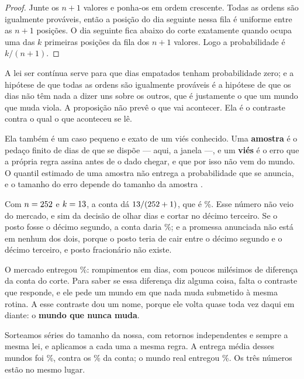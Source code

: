 \begin{proof}
Junte os $n+1$ valores e ponha-os em ordem crescente. Todas as ordens são igualmente
prováveis, então a posição do dia seguinte nessa fila é uniforme entre as $n+1$ posições. O
dia seguinte fica abaixo do corte exatamente quando ocupa uma das $k$ primeiras posições da
fila dos $n+1$ valores. Logo a probabilidade é $k/(n+1)$.
\end{proof}

A lei ser contínua serve para que dias empatados tenham probabilidade zero; e a hipótese de
que todas as ordens são igualmente prováveis é a hipótese de que os dias não têm nada a dizer
uns sobre os outros, que é justamente o que um mundo que muda viola\cite{vovk2022algorithmic}. A proposição não prevê o
que vai acontecer. Ela é o contraste contra o qual o que aconteceu se lê.

Ela também é um caso pequeno e exato de um viés conhecido. Uma \textbf{amostra} é o pedaço
finito de dias de que se dispõe --- aqui, a janela ---, e um \textbf{viés} é o erro que a própria
regra assina antes de o dado chegar, e que por isso não vem do mundo.
O quantil estimado de uma amostra não entrega a probabilidade que se anuncia, e o tamanho do
erro depende do tamanho da amostra \cite{taleb2020super}.

Com $n = 252$ e $k = 13$, a conta dá
$13/(252+1)$, que é \numCorteContaPct\%. Esse número não veio do
mercado, e sim da decisão de olhar \numCorteJanela{} dias e cortar no décimo terceiro. Se o
posto fosse o décimo segundo, a conta daria \numCorteAlternativoPct\%; e a promessa anunciada
não está em nenhum dos dois, porque o posto teria de cair entre o décimo segundo e o décimo
terceiro, e posto fracionário não existe.

O mercado entregou \numEntregaTaxaPct\%: \numEntregaViolacoes{} rompimentos em
\numEntregaDias{} dias, com poucos milésimos de diferença da conta do corte. Para saber se
essa diferença diz alguma coisa, falta o contraste que responde, e ele pede um mundo em que
nada muda submetido à mesma rotina.
A esse contraste dou um nome, porque ele volta quase toda vez daqui em diante: o \textbf{mundo
que nunca muda}.

Sorteamos \numNuncaMudaMundos{} séries do tamanho da nossa, com retornos independentes e
sempre a mesma lei, e aplicamos a cada uma a mesma regra. A entrega média desses mundos foi
\numNuncaMudaTaxaPct\%, contra os \numCorteContaPct\% da conta; o mundo real entregou
\numEntregaTaxaPct\%. Os três números estão no mesmo lugar.

